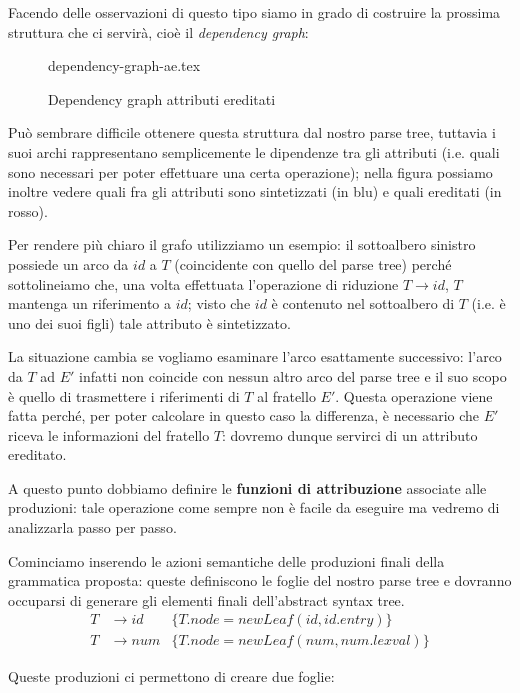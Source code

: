 \documentclass[class=book, crop=false, oneside, 12pt]{standalone}
\begin{document}
Facendo delle osservazioni di questo tipo siamo in grado di costruire la prossima struttura che ci servirà, cioè il \emph{dependency graph}: 

\begin{figure}[H]
	\centering
    {dependency-graph-ae.tex}
    \caption{Dependency graph attributi ereditati}
    \label{fig:dependency-graph-ae}
\end{figure}

Può sembrare difficile ottenere questa struttura dal nostro parse tree, tuttavia i suoi archi rappresentano semplicemente le dipendenze tra gli attributi (i.e. quali sono necessari per poter effettuare una certa operazione); nella figura possiamo inoltre vedere quali fra gli attributi sono sintetizzati (in blu) e quali ereditati (in rosso). 

Per rendere più chiaro il grafo utilizziamo un esempio: il sottoalbero sinistro possiede un arco da \(id\) a \(T\) (coincidente con quello del parse tree) perché sottolineiamo che, una volta effettuata l'operazione di riduzione \(T \to id\), \(T\) mantenga un riferimento a \(id\); visto che \(id\) è contenuto nel sottoalbero di \(T\) (i.e. è uno dei suoi figli) tale attributo è sintetizzato. 

La situazione cambia se vogliamo esaminare l'arco esattamente successivo: l'arco da \(T\) ad \(E'\) infatti non coincide con nessun altro arco del parse tree e il suo scopo è quello di trasmettere i riferimenti di \(T\) al fratello \(E'\). Questa operazione viene fatta perché, per poter calcolare in questo caso la differenza, è necessario che \(E'\) riceva le informazioni del fratello \(T\): dovremo dunque servirci di un attributo ereditato.

A questo punto dobbiamo definire le \textbf{funzioni di attribuzione} associate alle produzioni: tale operazione come sempre non è facile da eseguire ma vedremo di analizzarla passo per passo. 

Cominciamo inserendo le azioni semantiche delle produzioni finali della grammatica proposta: queste definiscono le foglie del nostro parse tree e dovranno occuparsi di generare gli elementi finali dell'abstract syntax tree.
\begin{align*}
    T &\to id &\{T.node = newLeaf(id, id.entry)\} \\
    T &\to num &\{T.node = newLeaf(num, num.lexval)\}
\end{align*}

Queste produzioni ci permettono di creare due foglie:
\end{document}
